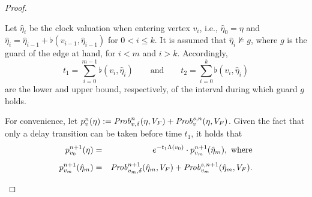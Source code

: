 \documentclass{LMCS}
\newcommand{\<}{\langle}
\renewcommand{\>}{\rangle}
\newcommand{\Prob}{{\it Prob}}
\begin{document}
\begin{proof}
\begin{enumerate}[(1)]
Let $\hat\eta_i$ be the clock valuation when entering vertex $v_{i}$, i.e., $\hat\eta_0
= \eta$ and $\hat\eta_i = \hat\eta_{i-1} + \flat(v_{i-1},\hat\eta_{i-1})$ for $0 < i \leqslant
k$.
It is assumed that $\hat\eta_i \not\models g$, where $g$ is the guard of the edge
at hand, for $i < m$ and $i > k$.
Accordingly,
$$
t_1=\sum_{i=0}^{m-1}\flat(v_i,{\hat\eta}_i) \qquad\mbox{and} \qquad
t_2=\sum_{i=0}^{k}\flat(v_i,{\hat\eta}_i)
$$
are the lower and upper bound, respectively, of the interval during which guard $g$ holds.

For convenience, let $p_{v}^{n}(\eta) := \Prob_{v,\delta}^n(\eta,V_F) +
{\Prob}_{v}^{s,n}(\eta,V_F)$.
Given the fact that only a delay transition can be taken before time $t_1$, it holds that
\begin{eqnarray*}
p_{v_0}^{n+1}(\eta) & = &
e^{-t_1\Lambda(v_0)}\cdot p_{v_m}^{n+1}(\hat\eta_m), \mbox{ where} \nonumber \\[1ex]
p_{v_m}^{n+1}(\hat\eta_m) & = &
\Prob^{n+1}_{v_m,\delta}(\hat\eta_m,V_F)+\Prob^{s,n+1}_{v_m}(\hat\eta_m,V_F).
\end{eqnarray*}



\end{enumerate}
\end{proof}
\end{document}
